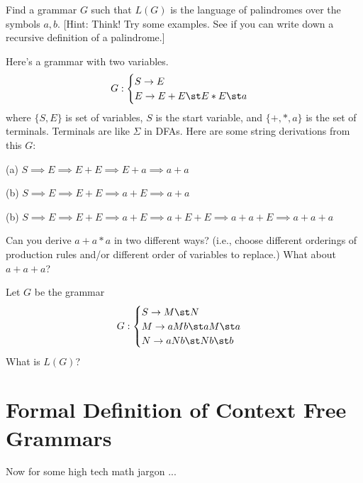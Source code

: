 \begin{ex}
Find a grammar $G$ such that $L(G)$ is the language of palindromes over the
symbols $a, b$. [Hint: Think! Try some examples. See if you can write down
a recursive definition of a palindrome.]
\end{ex}

\begin{ex}
Here's a grammar with two variables.
\[
G:
\begin{cases}
S \rightarrow E \\
E \rightarrow E + E \st E * E \st a
\end{cases}
\]
where $\{S, E\}$ is set of variables, $S$ is the start variable, and 
$\{+, *, a\}$ is the set of terminals.
Terminals are like $\Sigma$ in DFAs.
Here are some string derivations from this $G$:
\begin{mylist}
\item[(a)] $S \implies E \implies E + E \implies E + a \implies a + a$
\item[(b)] $S \implies E \implies E + E \implies a + E \implies a + a$
\item[(b)] $S \implies E \implies E + E \implies a + E \implies a + E + E
\implies a + a + E \implies a + a + a$
\end{mylist}
Can you derive $a + a * a$ in two different ways?
(i.e., choose different orderings of production rules and/or different
order of variables to replace.)
What about $a + a + a$?
\end{ex}

\begin{ex}
Let $G$ be the grammar
\[
G:
\begin{cases}
S \rightarrow M \st N \\
M \rightarrow aMb \st aM \st a \\
N \rightarrow aNb \st Nb \st b
\end{cases}
\]
What is $L(G)$?
\end{ex}





\newpage
\section{Formal Definition of Context Free Grammars}

Now for some high tech math jargon ...

